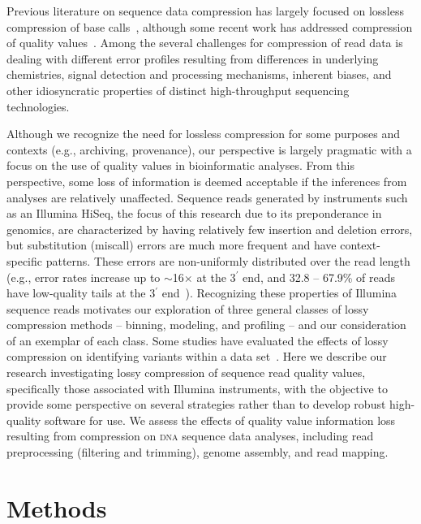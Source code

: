 \documentclass[fleqn,10pt,lineno]{wlpeerj} %
\begin{document}
Previous literature on sequence data compression has largely focused
on lossless compression of base calls~\cite[reviewed
  in][]{Deorowicz:2013hq, Giancarlo:2009fk,Giancarlo:2014rw,
  Nalbantoglu:2010uq,Zhu:2013qr}, although some recent work has
addressed compression of quality
values~\cite[e.g.,][]{Canovas:2014fr,Hach:2012ys,
  janin2013adaptive,Kozanitis:2011kl,Ochoa:2013rt,Tembe:2010ys,
  Wan:2012kq,DBLP:conf/recomb/YuYB14,zhou2014compression,Malysa01102015}.
Among the several challenges for compression of read data is dealing
with different error profiles resulting from differences in underlying
chemistries, signal detection and processing mechanisms, inherent
biases, and other idiosyncratic properties of distinct high-throughput
sequencing technologies.

Although we recognize the need for lossless compression for some
purposes and contexts (e.g., archiving, provenance), our perspective
is largely pragmatic with a focus on the use of quality values in
bioinformatic analyses. From this perspective, some loss of
information is deemed acceptable if the inferences from analyses are
relatively unaffected. Sequence reads generated by instruments such as
an Illumina HiSeq, the focus of this research due to its preponderance
in genomics, are characterized by having relatively few insertion and
deletion errors, but substitution (miscall) errors are much more
frequent and have context-specific patterns. These errors are
non-uniformly distributed over the read length (e.g., error rates
increase up to $\sim$16$\times$ at the 3$^{\prime}$ end, and 32.8 --
67.9\% of reads have low-quality tails at the 3$^{\prime}$
end~\citep{Minoche:2011km}). Recognizing these properties of Illumina
sequence reads motivates our exploration of three general classes of
lossy compression methods -- binning, modeling, and profiling -- and
our consideration of an exemplar of each class. Some studies have
evaluated the effects of lossy compression on identifying variants
within a data set~\citep{Canovas:2014fr,janin2013adaptive}. Here we
describe our research investigating lossy compression of sequence read
quality values, specifically those associated with Illumina
instruments, with the objective to provide some perspective on several
strategies rather than to develop robust high-quality software for
use. We assess the effects of quality value information loss resulting
from compression on \textsc{dna} sequence data analyses, including
read preprocessing (filtering and trimming), genome assembly, and read
mapping.
\section*{Methods}
\end{document}
